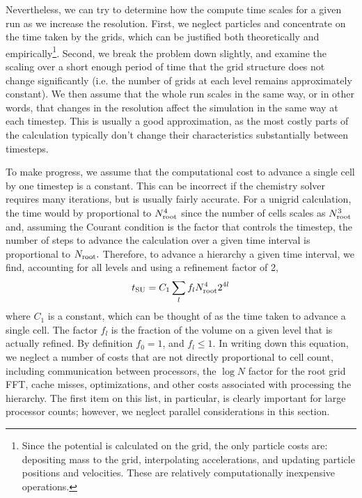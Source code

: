Nevertheless, we can try to determine how the compute time scales for
a given run as we increase the resolution.  First, we neglect
particles and concentrate on the time taken by the grids, which can be
justified both theoretically and empirically\footnote{Since the
potential is calculated on the grid, the only particle costs are:
depositing mass to the grid, interpolating accelerations, and updating
particle positions and velocities.  These are relatively
computationally inexpensive operations.}.  Second, we break the
problem down slightly, and examine the scaling over a short enough
period of time that the grid structure does not change significantly
(i.e. the number of grids at each level remains approximately
constant).  We then assume that the whole run scales in the same way,
or in other words, that changes in the resolution affect the
simulation in the same way at each timestep.  This is usually a good
approximation, as the most costly parts of the calculation typically
don't change their characteristics substantially between timesteps.

To make progress, we assume that the computational cost to advance a
single cell by one timestep is a constant.  This can be incorrect if
the chemistry solver requires many iterations, but is usually fairly
accurate.  For a unigrid calculation, the time would by proportional
to $N_{\rm root}^4$ since the number of cells scales as $N_{\rm
root}^3$ and, assuming the Courant condition is the 
factor that controls the timestep, the number of steps to advance the
calculation over a given time interval is
proportional to $N_{\rm root}.$ Therefore, to advance a hierarchy a
given time interval, we find, accounting for all levels and using a refinement
factor of 2,
\begin{equation} t_{\rm SU} = C_1 \sum_l f_l N_{\rm root}^4 2^{4l}
\end{equation} where $C_1$ is a constant, which can be thought of as
the time taken to advance a single cell.  The factor $f_l$ is the
fraction of the volume on a given level that is actually refined.  By
definition $f_0 = 1$, and $f_l \le 1$.  In writing down this equation,
we neglect a number of costs that are not directly proportional to
cell count, including communication between processors, the $\log{N}$
factor for the root grid FFT, cache misses, optimizations, and other
costs associated with processing the hierarchy.  The first item on
this list, in particular, is clearly important for large processor
counts; however, we neglect parallel considerations in this section.

